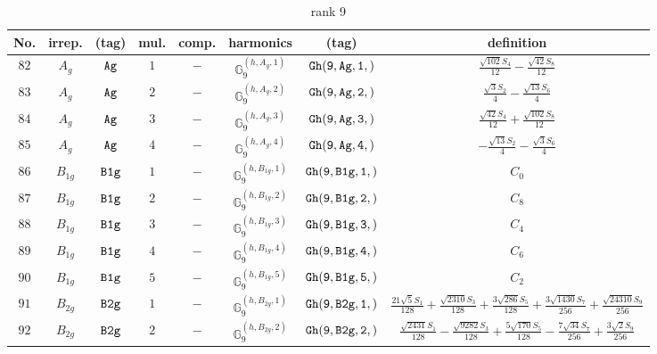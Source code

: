 \documentclass[fleqn,8pt]{jsarticle}
\begin{document}
\begin{table}[ht!]
\begin{center}
\caption{rank 9}
\renewcommand{\arraystretch}{1.3}
\begin{tabular}{cccccccc} \hline \hline
No. & irrep. & (tag) & mul. & comp. & harmonics & (tag) & definition \\ \hline
$ 82 $ & $ A_{g} $ & $ {\tt Ag} $ & $ 1 $ & $ - $ & $ \mathbb{G}_{9}^{(h,A_{g},1)} $ & $ {\tt Gh(9,Ag,1,)} $ & $ \frac{\sqrt{102} S_{4}}{12} - \frac{\sqrt{42} S_{8}}{12} $ \\
$ 83 $ & $ A_{g} $ & $ {\tt Ag} $ & $ 2 $ & $ - $ & $ \mathbb{G}_{9}^{(h,A_{g},2)} $ & $ {\tt Gh(9,Ag,2,)} $ & $ \frac{\sqrt{3} S_{2}}{4} - \frac{\sqrt{13} S_{6}}{4} $ \\
$ 84 $ & $ A_{g} $ & $ {\tt Ag} $ & $ 3 $ & $ - $ & $ \mathbb{G}_{9}^{(h,A_{g},3)} $ & $ {\tt Gh(9,Ag,3,)} $ & $ \frac{\sqrt{42} S_{4}}{12} + \frac{\sqrt{102} S_{8}}{12} $ \\
$ 85 $ & $ A_{g} $ & $ {\tt Ag} $ & $ 4 $ & $ - $ & $ \mathbb{G}_{9}^{(h,A_{g},4)} $ & $ {\tt Gh(9,Ag,4,)} $ & $ - \frac{\sqrt{13} S_{2}}{4} - \frac{\sqrt{3} S_{6}}{4} $ \\
$ 86 $ & $ B_{1g} $ & $ {\tt B1g} $ & $ 1 $ & $ - $ & $ \mathbb{G}_{9}^{(h,B_{1g},1)} $ & $ {\tt Gh(9,B1g,1,)} $ & $ C_{0} $ \\
$ 87 $ & $ B_{1g} $ & $ {\tt B1g} $ & $ 2 $ & $ - $ & $ \mathbb{G}_{9}^{(h,B_{1g},2)} $ & $ {\tt Gh(9,B1g,2,)} $ & $ C_{8} $ \\
$ 88 $ & $ B_{1g} $ & $ {\tt B1g} $ & $ 3 $ & $ - $ & $ \mathbb{G}_{9}^{(h,B_{1g},3)} $ & $ {\tt Gh(9,B1g,3,)} $ & $ C_{4} $ \\
$ 89 $ & $ B_{1g} $ & $ {\tt B1g} $ & $ 4 $ & $ - $ & $ \mathbb{G}_{9}^{(h,B_{1g},4)} $ & $ {\tt Gh(9,B1g,4,)} $ & $ C_{6} $ \\
$ 90 $ & $ B_{1g} $ & $ {\tt B1g} $ & $ 5 $ & $ - $ & $ \mathbb{G}_{9}^{(h,B_{1g},5)} $ & $ {\tt Gh(9,B1g,5,)} $ & $ C_{2} $ \\
$ 91 $ & $ B_{2g} $ & $ {\tt B2g} $ & $ 1 $ & $ - $ & $ \mathbb{G}_{9}^{(h,B_{2g},1)} $ & $ {\tt Gh(9,B2g,1,)} $ & $ \frac{21 \sqrt{5} S_{1}}{128} + \frac{\sqrt{2310} S_{3}}{128} + \frac{3 \sqrt{286} S_{5}}{128} + \frac{3 \sqrt{1430} S_{7}}{256} + \frac{\sqrt{24310} S_{9}}{256} $ \\
$ 92 $ & $ B_{2g} $ & $ {\tt B2g} $ & $ 2 $ & $ - $ & $ \mathbb{G}_{9}^{(h,B_{2g},2)} $ & $ {\tt Gh(9,B2g,2,)} $ & $ \frac{\sqrt{2431} S_{1}}{128} - \frac{\sqrt{9282} S_{3}}{128} + \frac{5 \sqrt{170} S_{5}}{128} - \frac{7 \sqrt{34} S_{7}}{256} + \frac{3 \sqrt{2} S_{9}}{256} $ \\

\end{tabular}
\end{center}
\end{table}
\end{document}
